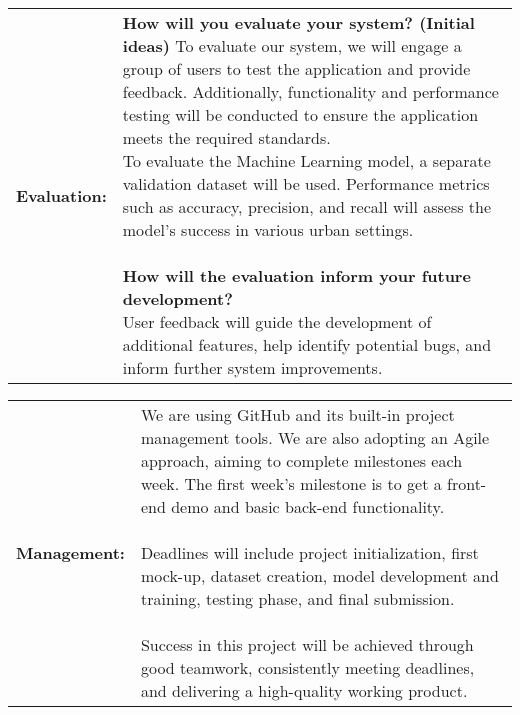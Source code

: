 \documentclass[a4paper,12pt]{article}
\begin{document}
\vspace{0.5cm}
\begin{center}
    \begin{tabular}{|p{}|p{}|}
        \hline
        \textbf{Evaluation:} & \parbox{0.65\textwidth}{\vspace{0.3cm}\textbf{How will you evaluate your system? (Initial ideas)} \vspace{0.3cm}
        To evaluate our system, we will engage a group of users to test the application and provide feedback. Additionally, functionality and performance testing will be conducted to ensure the application meets the required standards.
        \\ To evaluate the Machine Learning model, a separate validation dataset will be used. Performance metrics such as accuracy, precision, and recall will assess the model’s success in various urban settings.
        \\ \\
        \vspace{0.3cm}\textbf{How will the evaluation inform your future development?}\vspace{0.3cm}
        \\ User feedback will guide the development of additional features, help identify potential bugs, and inform further system improvements.
        \vspace{0.3cm}} \\ 
        \hline
    \end{tabular}
\end{center}

\vspace{0.5cm}
\begin{center}
    \begin{tabular}{|p{}|p{}|}
        \hline
        \textbf{Management:} & \parbox{0.65\textwidth}{\vspace{0.3cm}
        We are using GitHub and its built-in project management tools. We are also adopting an Agile approach, aiming to complete milestones each week. The first week's milestone is to get a front-end demo and basic back-end functionality.
        \\ \\ Deadlines will include project initialization, first mock-up, dataset creation, model development and training, testing phase, and final submission. \\ \\ Success in this project will be achieved through good teamwork, consistently meeting deadlines, and delivering a high-quality working product.
        \vspace{0.3cm}} \\ 
        \hline
    \end{tabular}
\end{center}
\end{document}
